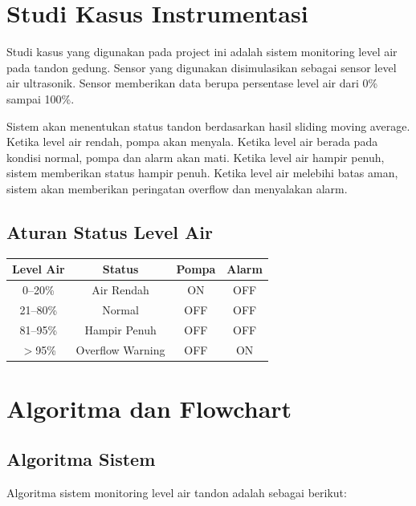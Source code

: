 \documentclass[12pt,a4paper]{article}
\begin{document}
\section{Studi Kasus Instrumentasi}

Studi kasus yang digunakan pada project ini adalah sistem monitoring level air pada tandon gedung. Sensor yang digunakan disimulasikan sebagai sensor level air ultrasonik. Sensor memberikan data berupa persentase level air dari 0\% sampai 100\%.

Sistem akan menentukan status tandon berdasarkan hasil sliding moving average. Ketika level air rendah, pompa akan menyala. Ketika level air berada pada kondisi normal, pompa dan alarm akan mati. Ketika level air hampir penuh, sistem memberikan status hampir penuh. Ketika level air melebihi batas aman, sistem akan memberikan peringatan overflow dan menyalakan alarm.

\subsection{Aturan Status Level Air}

\begin{center}
\begin{tabular}{|c|c|c|c|}
\hline
\textbf{Level Air} & \textbf{Status} & \textbf{Pompa} & \textbf{Alarm} \\
\hline
0--20\% & Air Rendah & ON & OFF \\
\hline
21--80\% & Normal & OFF & OFF \\
\hline
81--95\% & Hampir Penuh & OFF & OFF \\
\hline
$>$95\% & Overflow Warning & OFF & ON \\
\hline
\end{tabular}
\end{center}

\section{Algoritma dan Flowchart}

\subsection{Algoritma Sistem}

Algoritma sistem monitoring level air tandon adalah sebagai berikut:
\end{document}
